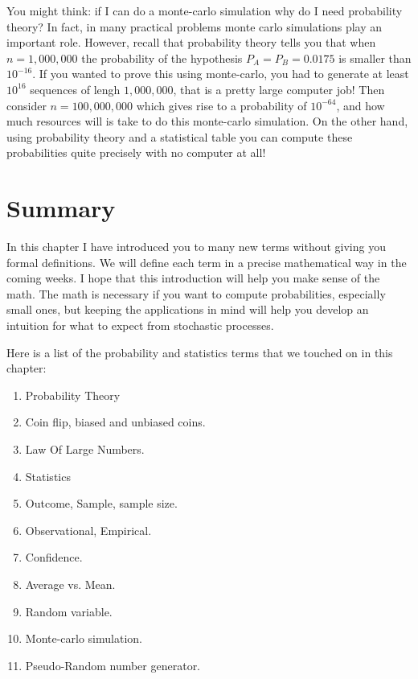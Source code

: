 You might think: if I can do a monte-carlo simulation why do I need
probability theory? In fact, in many practical problems monte carlo
simulations play an important role. However, recall that probability
theory tells you that when $n=1,000,000$ the probability of the
hypothesis $P_A=P_B=0.0175$ is smaller than $10^{-16}$. If you wanted
to prove this using monte-carlo, you had to generate at least
$10^{16}$ sequences of lengh $1,000,000$, that is a pretty large
computer job! Then consider $n=100,000,000$ which gives rise to a
probability of $10^{-64}$, and how much resources will is take to do
this monte-carlo simulation. On the other hand, using probability
theory and a statistical table you can compute these probabilities
quite precisely with no computer at all!


\section{Summary}

In this chapter I have introduced you to many new terms without giving
you formal definitions. We will define each term in a precise
mathematical way in the coming weeks. I hope that this introduction
will help you make sense of the math. The math is necessary if you
want to compute probabilities, especially small ones, but keeping the
applications in mind will help you develop an intuition for what to
expect from stochastic processes.

Here is a list of the probability and statistics terms that we touched
on in this chapter:
\begin{enumerate}
\item Probability Theory
\item Coin flip, biased and unbiased coins.
\item Law Of Large Numbers.
\item Statistics
\item Outcome, Sample, sample size.
\item Observational, Empirical.
\item Confidence.
\item Average vs. Mean.
\item Random variable.
\item Monte-carlo simulation.
\item Pseudo-Random number generator.
\end{enumerate}



